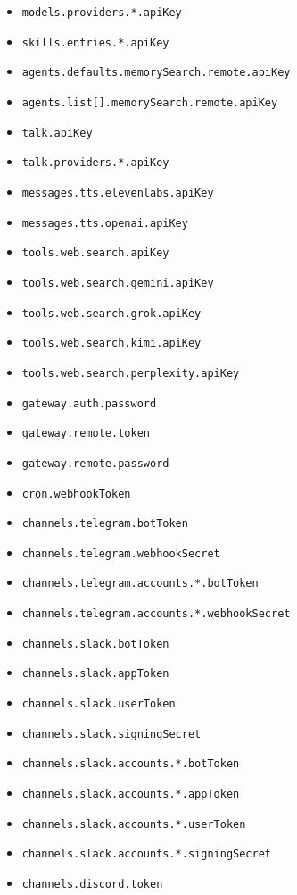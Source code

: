 \begin{itemize}
  \item \texttt{models.providers.*.apiKey}
  \item \texttt{skills.entries.*.apiKey}
  \item \texttt{agents.defaults.memorySearch.remote.apiKey}
  \item \texttt{agents.list[].memorySearch.remote.apiKey}
  \item \texttt{talk.apiKey}
  \item \texttt{talk.providers.*.apiKey}
  \item \texttt{messages.tts.elevenlabs.apiKey}
  \item \texttt{messages.tts.openai.apiKey}
  \item \texttt{tools.web.search.apiKey}
  \item \texttt{tools.web.search.gemini.apiKey}
  \item \texttt{tools.web.search.grok.apiKey}
  \item \texttt{tools.web.search.kimi.apiKey}
  \item \texttt{tools.web.search.perplexity.apiKey}
  \item \texttt{gateway.auth.password}
  \item \texttt{gateway.remote.token}
  \item \texttt{gateway.remote.password}
  \item \texttt{cron.webhookToken}
  \item \texttt{channels.telegram.botToken}
  \item \texttt{channels.telegram.webhookSecret}
  \item \texttt{channels.telegram.accounts.*.botToken}
  \item \texttt{channels.telegram.accounts.*.webhookSecret}
  \item \texttt{channels.slack.botToken}
  \item \texttt{channels.slack.appToken}
  \item \texttt{channels.slack.userToken}
  \item \texttt{channels.slack.signingSecret}
  \item \texttt{channels.slack.accounts.*.botToken}
  \item \texttt{channels.slack.accounts.*.appToken}
  \item \texttt{channels.slack.accounts.*.userToken}
  \item \texttt{channels.slack.accounts.*.signingSecret}
  \item \texttt{channels.discord.token}

\end{itemize}
